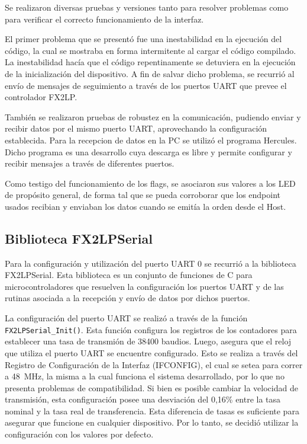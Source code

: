 
Se realizaron diversas pruebas y versiones tanto para resolver problemas como para verificar el correcto funcionamiento de la interfaz.

El primer problema que se presentó fue una inestabilidad en la ejecución del código, la cual se mostraba en forma intermitente al cargar el código compilado. La inestabilidad hacía que el código repentinamente se detuviera en la ejecución de la inicialización del dispositivo. A fin de salvar dicho problema, se recurrió al envío de mensajes de seguimiento a través de los puertos UART que prevee el controlador FX2LP.

También se realizaron pruebas de robustez en la comunicación, pudiendo enviar y recibir datos por el mismo puerto UART, aprovechando la configuración establecida. Para la recepcion de datos en la PC se utilizó el programa Hercules\cite{HWGroup}. Dicho programa es una desarrollo cuya descarga es libre y permite configurar y recibir mensajes a través de diferentes puertos.

Como testigo del funcionamiento de los flags, se asociaron sus valores a los LED de propósito general, de forma tal que se pueda corroborar que los endpoint usados recibian y enviaban los datos cuando se emitía la orden desde el Host.

\subsection{Biblioteca FX2LPSerial}
Para la configuración y utilización del puerto UART 0 se recurrió a la biblioteca FX2LPSerial\cite{Kumar2017}. Esta biblioteca es un conjunto de funciones de C para microcontroladores que resuelven la configuración los puertos UART y de las rutinas asociada a la recepción y envío de datos por dichos puertos. 

La configuración del puerto UART se realizó a través de la función \verb|FX2LPSerial_Init()|. Esta función configura los registros de los contadores para establecer una tasa de transmión de 38400 baudios. Luego, asegura que el reloj que utiliza el puerto UART se encuentre configurado. Esto se realiza a través del Registro de Configuración de la Interfaz (IFCONFIG), el cual se setea para correr a \SI{48}{\mega\hertz}, la misma a la cual funciona el sistema desarrollado, por lo que no presenta problemas de compatibilidad. Si bien es posible cambiar la velocidad de transmisión, esta configuración posee una desviación del 0,16\%\cite{CypressSemiconductor2014fx2lp} entre la tasa nominal y la tasa real de transferencia. Esta diferencia de tasas es suficiente para asegurar que funcione en cualquier dispositivo. Por lo tanto, se decidió utilizar la configuración con los valores por defecto.

